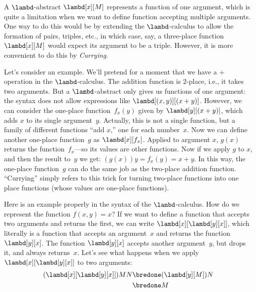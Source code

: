 \documentclass[../../../include/open-logic-section]{subfiles}
\begin{document}

A $\lambd$-abstract $\lambd[x][M]$ represents a function of one
argument, which is quite a limitation when we want to define function
accepting multiple arguments.  One way to do this would be by
extending the $\lambd$-calculus to allow the formation of pairs,
triples, etc., in which case, say, a three-place function
$\lambd[x][M]$ would expect its argument to be a triple.  However, it
is more convenient to do this by \emph{Currying}.

Let's consider an example. We'll pretend for a moment that we have a
$+$ operation in the $\lambd$-calculus. The addition function is
$2$-place, i.e., it takes two arguments.  But a $\lambd$-abstract only
gives us functions of one argument: the syntax does not allow
expressions like $\lambd[(x,y)][(x+y)]$.  However, we can consider the
one-place function~$f_x(y)$ given by $\lambd[y][(x+y)]$, which adds
$x$ to its single argument~$y$.  Actually, this is not a single
function, but a family of different functions ``add $x$,'' one for
each number~$x$.  Now we can define another one-place function~$g$ as
$\lambd[x][f_x]$. Applied to argument $x$, $g(x)$ returns the
function~$f_x$---so its values are other functions.  Now if we apply
$g$ to $x$, and then the result to~$y$ we get: $(g(x))y = f_x(y) =
x+y$.  In this way, the one-place function~$g$ can do the same job as
the two-place addition function. ``Currying'' simply refers to this
trick for turning two-place functions into one place functions (whose
values are one-place functions).

Here is an example properly in the syntax of the $\lambd$-calculus.
How do we represent the function $f(x,y) = x$? If we want to define a
function that accepts two arguments and returns the first, we can
write $\lambd[x][\lambd[y][x]]$, which literally is a function that
accepts an argument~$x$ and returns the function~$\lambd[y][x]$. The
function $\lambd[y][x]$ accepts another argument~$y$, but drops it,
and always returns~$x$.  Let's see what happens when we apply
$\lambd[x][\lambd[y][x]]$ to two arguments:
\begin{align*}
  (\lambd[x][\lambd[y][x]])MN 
  \bredone & (\lambd[y][M])N \\
  \bredone & M
\end{align*}
\end{document}

